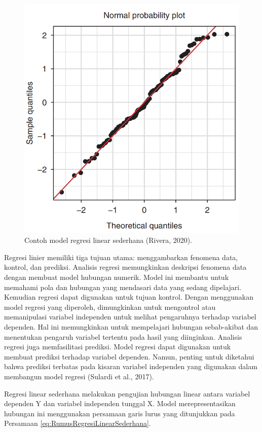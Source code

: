 \begin{figure}[H]
  \centering
  \includegraphics[scale=0.43]{gambar/plotregresilinear.png}
  \caption{Contoh model regresi linear sederhana (Rivera, 2020).}
  \label{fig:plotregresilinear}
\end{figure}

Regresi linier memiliki tiga tujuan utama: menggambarkan fenomena data, kontrol, dan prediksi. Analisis regresi memungkinkan deskripsi fenomena data dengan membuat model hubungan numerik. Model ini membantu untuk memahami pola dan hubungan yang mendasari data yang sedang dipelajari. Kemudian regresi dapat digunakan untuk tujuan kontrol. Dengan menggunakan model regresi yang diperoleh, dimungkinkan untuk mengontrol atau memanipulasi variabel independen untuk melihat pengaruhnya terhadap variabel dependen. Hal ini memungkinkan untuk mempelajari hubungan sebab-akibat dan menentukan pengaruh variabel tertentu pada hasil yang diinginkan. Analisis regresi juga memfasilitasi prediksi. Model regresi dapat digunakan untuk membuat prediksi terhadap variabel dependen. Namun, penting untuk diketahui bahwa prediksi terbatas pada kisaran variabel independen yang digunakan dalam membangun model regresi (Sulardi et al., 2017).

Regresi linear sederhana melakukan pengujian hubungan linear antara variabel dependen Y dan variabel independen tunggal X. Model merepresentasikan hubungan ini menggunakan persamaan garis lurus yang ditunjukkan pada Persamaan \ref{eq:RumusRegresiLinearSederhana}.

